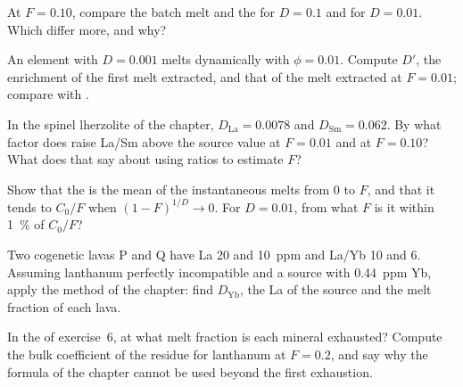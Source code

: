 \begin{exercise}[$\star\star$]\label{exo:b3:trace-element-modelling:7}
At $F = 0.10$, compare the batch melt and the  for
$D = 0.1$ and for $D = 0.01$. Which differ more, and why?
\end{exercise}

\begin{exercise}[$\star\star$]\label{exo:b3:trace-element-modelling:8}
An element with $D = 0.001$ melts dynamically with $\phi = 0.01$. Compute
$D'$, the enrichment of the first melt extracted, and that of the melt
extracted at $F = 0.01$; compare with .
\end{exercise}

\begin{exercise}[$\star\star$]\label{exo:b3:trace-element-modelling:9}
In the spinel lherzolite of the chapter, $D_{\mathrm{La}} = 0.0078$ and
$D_{\mathrm{Sm}} = 0.062$. By what factor does  raise La/Sm above
the source value at $F = 0.01$ and at $F = 0.10$? What does that say about
using ratios to estimate $F$?
\end{exercise}

\begin{exercise}[$\star\star\star$]\label{exo:b3:trace-element-modelling:10}
Show that the  is the mean of the instantaneous
melts from 0 to $F$, and that it tends to $C_0/F$ when $(1 - F)^{1/D} \to 0$.
For $D = 0.01$, from what $F$ is it within \qty{1}{\percent} of $C_0/F$?
\end{exercise}

\begin{exercise}[$\star\star\star$]\label{exo:b3:trace-element-modelling:11}
Two cogenetic lavas P and Q have La 20 and \qty{10}{ppm} and La/Yb 10 and 6.
Assuming lanthanum perfectly incompatible and a source with
\qty{0.44}{ppm} Yb, apply the method of the chapter: find $D_{\mathrm{Yb}}$,
the La of the source and the melt fraction of each lava.
\end{exercise}

\begin{exercise}[$\star\star\star$]\label{exo:b3:trace-element-modelling:12}
In the  of exercise~6, at what melt fraction is each mineral
exhausted? Compute the bulk coefficient of the residue for lanthanum at
$F = 0.2$, and say why the formula of the chapter cannot be used beyond the
first exhaustion.
\end{exercise}

